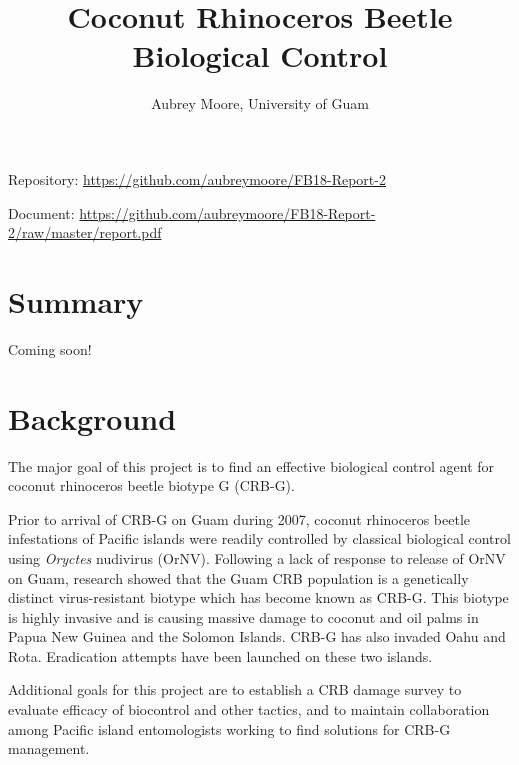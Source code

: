 \documentclass[12pt,letterpaper,english]{scrartcl}
\begin{document}
\titlehead{USDA APHIS Grant AP18PPQFO000C402\\
Progress Report 2\\
Report ID: AP18PPQFO000-PE-SA2-19\\
Performance Period: March 1, 2019 - August 31, 2019}
\title{Coconut Rhinoceros Beetle Biological Control}
\author{Aubrey Moore, University of Guam}
\maketitle

Repository: \url{https://github.com/aubreymoore/FB18-Report-2}

Document: \url{https://github.com/aubreymoore/FB18-Report-2/raw/master/report.pdf}

\newpage
\tableofcontents{}




\newpage
\section{Summary}

Coming soon!




\newpage
\section{Background}

The major goal of this project is to find an effective biological
control agent for coconut rhinoceros beetle biotype G (CRB-G). 

Prior to arrival of CRB-G on Guam during 2007, coconut rhinoceros beetle
infestations of Pacific islands were readily controlled by classical
biological control using \textit{Oryctes} nudivirus (OrNV). Following a lack
of response to release of OrNV on Guam, research showed that the Guam
CRB population is a genetically distinct virus-resistant biotype which
has become known as CRB-G. This biotype is highly invasive and is
causing massive damage to coconut and oil palms in Papua New Guinea
and the Solomon Islands. CRB-G has also invaded Oahu and Rota. Eradication
attempts have been launched on these two islands. 

Additional goals for this project are to establish a CRB damage survey to evaluate efficacy of biocontrol and other tactics, and to maintain collaboration
among Pacific island entomologists working to find solutions for CRB-G
management. 
\end{document}
